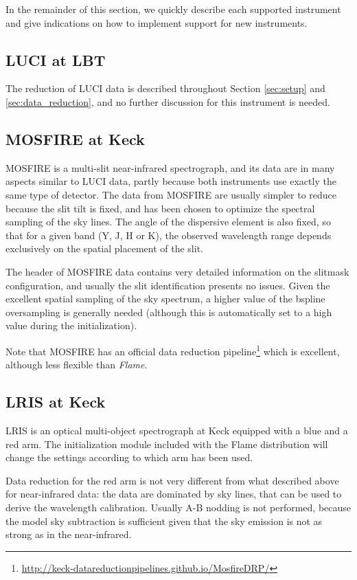 \documentclass[a4paper]{article}
\newcommand{\flame}{\emph{Flame}}
\begin{document}
\begin{sloppypar}
In the remainder of this section, we quickly describe each supported instrument and give indications on how to implement support for new instruments.


\subsection{LUCI at LBT}

The reduction of LUCI data is described throughout Section \ref{sec:setup} and \ref{sec:data_reduction}, and no further discussion for this instrument is needed.


\subsection{MOSFIRE at Keck}

MOSFIRE is a multi-slit near-infrared spectrograph, and its data are in many aspects similar to LUCI data, partly because both instruments use exactly the same type of detector. The data from MOSFIRE are usually simpler to reduce because the slit tilt is fixed, and has been chosen to optimize the spectral sampling of the sky lines. The angle of the dispersive element is also fixed, so that for a given band (Y, J, H or K), the observed wavelength range depends exclusively on the spatial placement of the slit.

The header of MOSFIRE data contains very detailed information on the slitmask configuration, and usually the slit identification presents no issues. Given the excellent spatial sampling of the sky spectrum, a higher value of the bspline oversampling is generally needed (although this is automatically set to a high value during the initialization).

Note that MOSFIRE has an official data reduction pipeline\footnote{\url{http://keck-datareductionpipelines.github.io/MosfireDRP/}} which is excellent, although less flexible than \flame.


\subsection{LRIS at Keck}

LRIS is an optical multi-object spectrograph at Keck equipped with a blue and a red arm. The initialization module included with the Flame distribution will change the settings according to which arm has been used.

Data reduction for the red arm is not very different from what described above for near-infrared data: the data are dominated by sky lines, that can be used to derive the wavelength calibration. Usually A-B nodding is not performed, because the model sky subtraction is sufficient given that the sky emission is not as strong as in the near-infrared.


\end{sloppypar}
\end{document}
